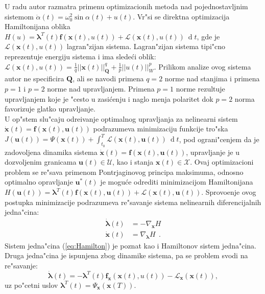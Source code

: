 \documentclass[a4paper,11pt]{article}
\theoremstyle{definition} \newtheorem{deff}{Definicija}[section]
\theoremstyle{definition} \newtheorem{prim}[deff]{Primer}
\theoremstyle{plain} \newtheorem{teor}[deff]{Teorema}
\newcommand{\vect}[1]{\boldsymbol{\mathbf{#1}}}
\begin{document}
	
	U radu \cite{inicijalna} autor razmatra primenu optimizacionih metoda nad pojednostavljnim sistemom $\ddot{\alpha}(t) = \omega_0^2 \operatorname{sin}\alpha(t) + u(t)$. Vr"si se direktna optimizacija Hamiltonijana oblika $H(u) = \vect{\lambda}^T(t)\vect{f}(\mathbf{x}(t), u(t)) + \mathcal{L}(\mathbf{x}(t), u(t))~\operatorname{d}t$, gde je $\mathcal{L}(\mathbf{x}(t), u(t))$ lagran"zijan sistema. Lagran"zijan sistema tipi"cno reprezentuje energiju sistema i ima slede\'ci oblik: $\mathcal{L}(\mathbf{x}(t), u(t)) = \frac{1}{q}||\mathbf{x}(t)||_{\mathbf{Q}}^q + \frac{1}{p}||u(t)||_{W}^p$. Prilikom analize ovog sistema autor ne specificira $\mathbf{Q}$, ali se navodi primena $q=2$ norme nad stanjima i primena $p=1$ i $p=2$ norme nad upravljanjem. Primena $p=1$ norme rezultuje upravljanjem koje je "cesto u zasi\'cenju i naglo menja polaritet dok $p = 2$ norma favorizuje glatko upravljanje. \\
	
	U op"stem slu"caju odre\dj ivanje optimalnog upravljanja za nelinearni sistem $\dot{\vect{x}}(t) = \vect{f}(\vect{x}(t), \vect{u}(t))$ podrazumeva minimizaciju funkcije tro"ska $J(\mathbf{u}(t)) = \Psi(\mathbf{x}(t)) + \int_{t_0}^{T}\mathcal{L}(\vect{x}(t), \vect{u}(t))~\operatorname{d}t$, pod ograni"cenjem da je zadovoljena dinamika sistema $\dot{\vect{x}}(t) = \vect{f}(\vect{x}(t), \vect{u}(t))$, upravljanje je u dozvoljenim granicama $\mathbf{u}(t)\in \mathbf{\mathcal{U}}$, kao i stanja $\mathbf{x}(t)\in \mathbf{\mathcal{X}}$.  Ovaj optimizacioni problem se re"sava primenom Pontrjaginovog principa maksimuma, odnosno optimalno opravljanje $\vect{u}^*(t)$ je mogu\'ce odrediti minimizacijom Hamiltonijana $H(\vect{u}(t)) = \vect{\lambda}^T(t)\vect{f}(\mathbf{x}(t), \vect{u}(t)) + \mathcal{L}(\mathbf{x}(t), \vect{u}(t))$. Sprovo\dj enje ovog postupka minimizacije podrazumeva re"savanje sistema nelinearnih diferencijalnih jedna"cina: 
	\begin{align}\label{eq:Hamilton}
		\dot{\vect{\lambda}}(t) &= -\nabla_{\vect{x}}H\\
		\dot{\vect{x}}(t) &= \nabla_{\vect{\lambda}}H~~.
	\end{align}
	Sistem jedna"cina (\ref{eq:Hamilton}) je poznat kao i Hamiltonov sistem jedna"cina. Druga jedna"cina je ispunjena zbog dinamike sistema, pa se problem svodi na re"savanje:
	\begin{equation}		\dot{\vect{\lambda}}(t) = -{\vect{\lambda}}^T(t)\vect{f}_{\mathbf{x}}(\mathbf{x}(t), u(t)) - \mathcal{L}_{\mathbf{x}}(\mathbf{x}(t)),
	\end{equation} 
	uz po"cetni uslov $\vect{\lambda}^T(t) = \Psi_{\mathbf{x}}(\mathbf{x}(T))$.\\
	
\end{document}
